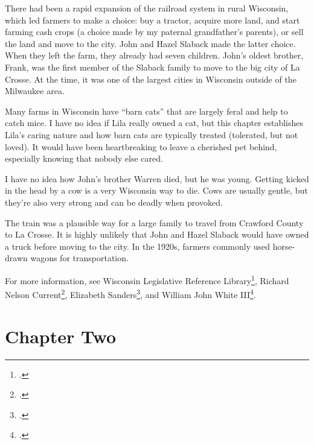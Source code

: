 \documentclass[
  letterpaper,
]{book}
\begin{document}
There had been a rapid expansion of the railroad system in rural
Wisconsin, which led farmers to make a choice: buy a tractor, acquire
more land, and start farming cash crops (a choice made by my paternal
grandfather's parents), or sell the land and move to the city. John and
Hazel Slaback made the latter choice. When they left the farm, they
already had seven children. John's oldest brother, Frank, was the first
member of the Slaback family to move to the big city of La Crosse. At
the time, it was one of the largest cities in Wisconsin outside of the
Milwaukee area.

Many farms in Wisconsin have ``barn cats'' that are largely feral and
help to catch mice. I have no idea if Lila really owned a cat, but this
chapter establishes Lila's caring nature and how barn cats are typically
treated (tolerated, but not loved). It would have been heartbreaking to
leave a cherished pet behind, especially knowing that nobody else cared.

I have no idea how John's brother Warren died, but he was young. Getting
kicked in the head by a cow is a very Wisconsin way to die. Cows are
usually gentle, but they're also very strong and can be deadly when
provoked.

The train was a plausible way for a large family to travel from Crawford
County to La Crosse. It is highly unlikely that John and Hazel Slaback
would have owned a truck before moving to the city. In the 1920s,
farmers commonly used horse-drawn wagons for transportation.

For more information, see Wisconsin Legislative Reference
Library\footnote{.},
Richard Nelson Current\footnote{.}, Elizabeth Sanders\footnote{.}, and William John White
III\footnote{.}.


\chapter{Chapter Two}\label{chapter-two}
\end{document}
